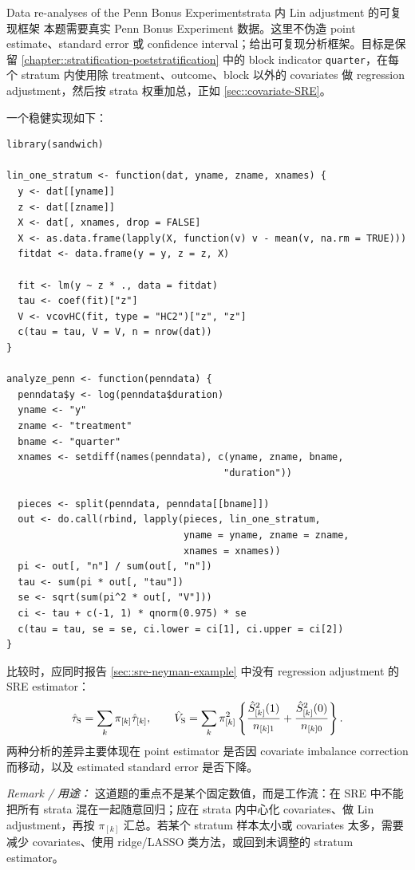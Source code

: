 \begin{exercisesolution}{Data re-analyses of the Penn Bonus Experiment}{strata 内 Lin adjustment 的可复现框架}
本题需要真实 Penn Bonus Experiment 数据。这里不伪造 point estimate、standard error 或 confidence interval；给出可复现分析框架。目标是保留 \cref{chapter::stratification-poststratification} 中的 block indicator \texttt{quarter}，在每个 stratum 内使用除 treatment、outcome、block 以外的 covariates 做 \citet{lin2013} regression adjustment，然后按 strata 权重加总，正如 \cref{sec::covariate-SRE}。

一个稳健实现如下：
\begin{lstlisting}
library(sandwich)

lin_one_stratum <- function(dat, yname, zname, xnames) {
  y <- dat[[yname]]
  z <- dat[[zname]]
  X <- dat[, xnames, drop = FALSE]
  X <- as.data.frame(lapply(X, function(v) v - mean(v, na.rm = TRUE)))
  fitdat <- data.frame(y = y, z = z, X)

  fit <- lm(y ~ z * ., data = fitdat)
  tau <- coef(fit)["z"]
  V <- vcovHC(fit, type = "HC2")["z", "z"]
  c(tau = tau, V = V, n = nrow(dat))
}

analyze_penn <- function(penndata) {
  penndata$y <- log(penndata$duration)
  yname <- "y"
  zname <- "treatment"
  bname <- "quarter"
  xnames <- setdiff(names(penndata), c(yname, zname, bname,
                                      "duration"))

  pieces <- split(penndata, penndata[[bname]])
  out <- do.call(rbind, lapply(pieces, lin_one_stratum,
                               yname = yname, zname = zname,
                               xnames = xnames))
  pi <- out[, "n"] / sum(out[, "n"])
  tau <- sum(pi * out[, "tau"])
  se <- sqrt(sum(pi^2 * out[, "V"]))
  ci <- tau + c(-1, 1) * qnorm(0.975) * se
  c(tau = tau, se = se, ci.lower = ci[1], ci.upper = ci[2])
}
\end{lstlisting}

比较时，应同时报告 \cref{sec::sre-neyman-example} 中没有 regression adjustment 的 SRE estimator：
\[
\hat\tau_\textsc{S}=\sum_k\pi_{[k]}\hat\tau_{[k]},
\qquad
\hat V_\textsc{S}=\sum_k\pi_{[k]}^2
\left\{\frac{\hat S_{[k]}^2(1)}{n_{[k]1}}
+\frac{\hat S_{[k]}^2(0)}{n_{[k]0}}\right\}.
\]
两种分析的差异主要体现在 point estimator 是否因 covariate imbalance correction 而移动，以及 estimated standard error 是否下降。

\emph{Remark / 用途：} 这道题的重点不是某个固定数值，而是工作流：在 SRE 中不能把所有 strata 混在一起随意回归；应在 strata 内中心化 covariates、做 Lin adjustment，再按 $\pi_{[k]}$ 汇总。若某个 stratum 样本太小或 covariates 太多，需要减少 covariates、使用 ridge/LASSO 类方法，或回到未调整的 stratum estimator。
\end{exercisesolution}

